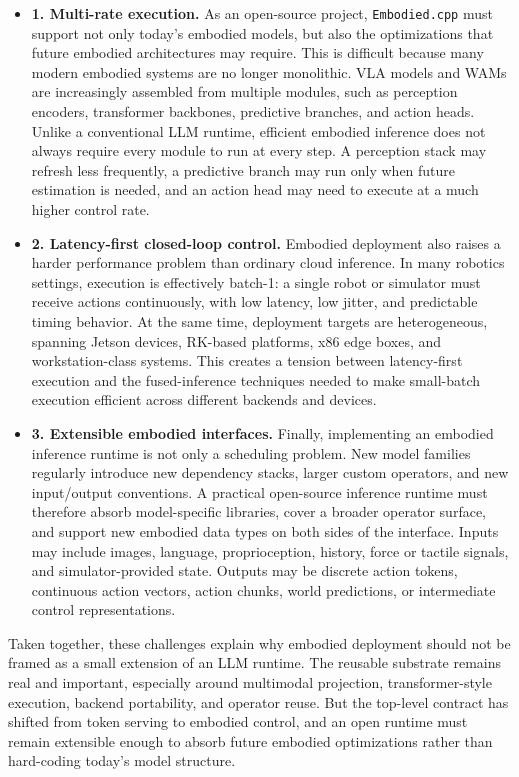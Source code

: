 \documentclass[11pt,letterpaper,logo]{seu-paisys}
\newcommand{\system}{\texttt{Embodied.cpp}\xspace}
\begin{document}
\begin{itemize}
    \item \textbf{1. Multi-rate execution.}
    As an open-source project, \system must support not only today's embodied models, but also the optimizations that future embodied architectures may require. This is difficult because many modern embodied systems are no longer monolithic. VLA models and WAMs are increasingly assembled from multiple modules, such as perception encoders, transformer backbones, predictive branches, and action heads. Unlike a conventional LLM runtime, efficient embodied inference does not always require every module to run at every step. A perception stack may refresh less frequently, a predictive branch may run only when future estimation is needed, and an action head may need to execute at a much higher control rate.

    \item \textbf{2. Latency-first closed-loop control.}
    Embodied deployment also raises a harder performance problem than ordinary cloud inference. In many robotics settings, execution is effectively batch-1: a single robot or simulator must receive actions continuously, with low latency, low jitter, and predictable timing behavior. At the same time, deployment targets are heterogeneous, spanning Jetson devices, RK-based platforms, x86 edge boxes, and workstation-class systems. This creates a tension between latency-first execution and the fused-inference techniques needed to make small-batch execution efficient across different backends and devices.

    \item \textbf{3. Extensible embodied interfaces.}
    Finally, implementing an embodied inference runtime is not only a scheduling problem. New model families regularly introduce new dependency stacks, larger custom operators, and new input/output conventions. A practical open-source inference runtime must therefore absorb model-specific libraries, cover a broader operator surface, and support new embodied data types on both sides of the interface. Inputs may include images, language, proprioception, history, force or tactile signals, and simulator-provided state. Outputs may be discrete action tokens, continuous action vectors, action chunks, world predictions, or intermediate control representations.
\end{itemize}

Taken together, these challenges explain why embodied deployment should not be framed as a small extension of an LLM runtime. The reusable substrate remains real and important, especially around multimodal projection, transformer-style execution, backend portability, and operator reuse. But the top-level contract has shifted from token serving to embodied control, and an open runtime must remain extensible enough to absorb future embodied optimizations rather than hard-coding today's model structure.
\end{document}
